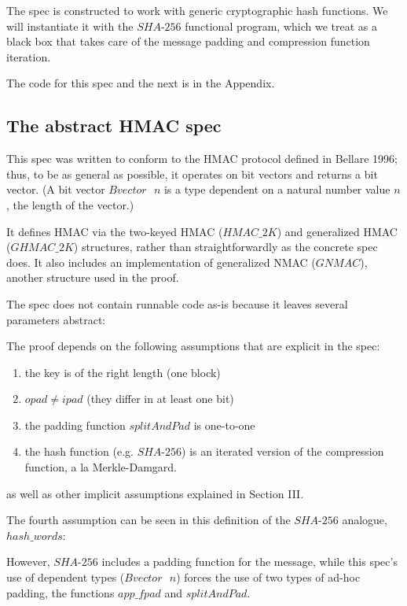 \documentclass[twocolumn,showpacs,%
  nofootinbib,aps,superscriptaddress,%
  eqsecnum,prd,notitlepage,showkeys,10pt]{revtex4-1}
\begin{document}
The spec is constructed to work with generic cryptographic hash functions. We will instantiate it with the $SHA$-$256$ functional program, which we treat as a black box that takes care of the message padding and compression function iteration.

The code for this spec and the next is in the Appendix.

\subsection{The abstract HMAC spec}

This spec was written to conform to the HMAC protocol defined in Bellare 1996; thus, to be as general as possible, it operates on bit vectors and returns a bit vector. (A bit vector $Bvector \textrm{ } n$ is a type dependent on a natural number value $n$, the length of the vector.)

It defines HMAC via the two-keyed HMAC ($HMAC\_2K$) and generalized HMAC ($GHMAC\_2K$) structures, rather than straightforwardly as the concrete spec does. It also includes an implementation of generalized NMAC ($GNMAC$), another structure used in the proof.

The spec does not contain runnable code as-is because it leaves several parameters abstract:




The proof depends on the following assumptions that are explicit in the spec:
\begin{enumerate}
\item the key is of the right length (one block)
\item $opad \neq ipad$ (they differ in at least one bit)
\item the padding function $splitAndPad$ is one-to-one
\item the hash function (e.g. $SHA$-$256$) is an iterated version of the compression function, a la Merkle-Damgard.
\end{enumerate}

as well as other implicit assumptions explained in Section III.

The fourth assumption can be seen in this definition of the $SHA$-$256$ analogue, $hash\_words$:



However, $SHA$-$256$ includes a padding function for the message, while this spec's use of dependent types ($Bvector \textrm{ } n$) forces the use of two types of ad-hoc padding, the functions $app\_fpad$ and $splitAndPad$.
\end{document}
